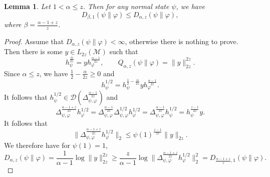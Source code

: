 \documentclass[12pt]{article}
\newtheorem{lemma}{Lemma}
\newtheorem{theorem}{Theorem}
\theoremstyle{definition}
\theoremstyle{remark}
\def\Me{\mathcal M}
\begin{document}
\begin{lemma}\label{lemma:ineq} Let $1<\alpha\le z$. Then for any normal state $\psi$, we have 
\[
D_{\beta,1}(\psi\|\varphi)\le D_{\alpha,z}(\psi\|\varphi),
\]
where $\beta=\frac{\alpha-1+z}z$.

\end{lemma}


\begin{proof}  
 Assume that
$D_{\alpha,z}(\psi\|\varphi)<\infty$, otherwise there is nothing to prove. Then there is
some $y\in L_{2z}(\Me)$ such that
\[
h_\psi^{\frac{\alpha}{2z}}=yh_\varphi^{\frac{\alpha-1}{2z}}, \qquad
Q_{\alpha,z}(\psi\|\varphi)=\|y\|_{2z}^{2z}.
\]
Since $\alpha\le z$, we have $\frac12-\frac{\alpha}{2z}\ge 0$ and
\[
h_\psi^{1/2}=h_\psi^{\frac12-\frac{\alpha}{2z}}yh_\varphi^{\frac{\alpha-1}{2z}}.
\]
It follows that $h_{\psi}^{1/2}\in \mathcal
D(\Delta_{\psi,\varphi}^{\frac{\alpha-1}{2z}})$ and
\[
\Delta^{\frac{\alpha-1+z}{2z}}_{\psi,\varphi}h_\varphi^{1/2}=\Delta^{\frac{\alpha-1}{2z}}_{\psi,\varphi}\Delta^{1/2}_{\psi,\varphi}h_\varphi^{1/2}=\Delta^{\frac{\alpha-1}{2z}}_{\psi,\varphi}h_\psi^{1/2}=h_\psi^{\frac{z-1}{2z}}y.
\]
It follows that 
\[
\|\Delta^{\frac{\alpha-1+z}{2z}}_{\psi,\varphi}h_\varphi^{1/2}\|_2\le
\psi(1)^{\frac{z-1}{2z}}\|y\|_{2z}.
\]
We therefore have for $\psi(1)=1$, 
\[
D_{\alpha,z}(\psi\|\varphi)=\frac{1}{\alpha-1}\log \|y\|_{2z}^{2z}\ge
\frac{z}{\alpha-1}\log\|\Delta^{\frac{\alpha-1+z}{2z}}_{\psi,\varphi}h_\varphi^{1/2}\|_2^{2}=D_{\frac{\alpha-1+z}z,1}(\psi\|\varphi).
\]
\end{proof}


%
%
%
%
%
%
%
%
%
\end{document}
